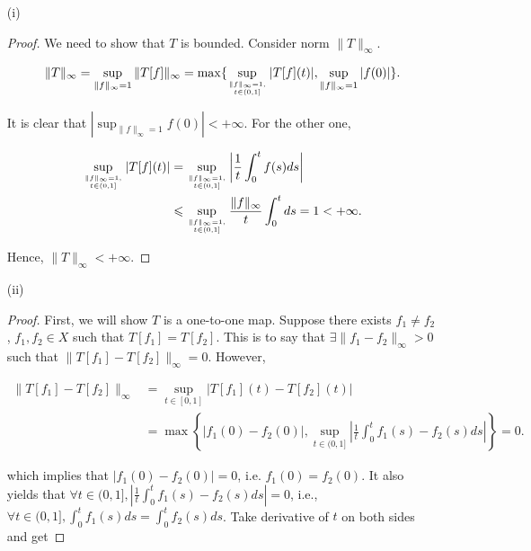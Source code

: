 \documentclass[12pt]{article}
\begin{document}
\begin{enumerate}

\item [(i)]

\begin{proof}

We need to show that $T$ is bounded. Consider norm $\|T\|_\infty$.

$$
\begin{aligned}
\|T\|_\infty = \sup_{\|f\|_\infty = 1} \|T[f]\|_\infty = \max \{  \sup_{\|f\|_\infty = 1,\atop t\in(0, 1]}|T[f](t)|, \sup_{\|f\|_\infty = 1} |f(0)| \}.
\end{aligned}
$$

It is clear that $|\sup_{\|f\|_\infty = 1}f(0)| <+\infty$. For the other one, 

$$
\begin{aligned}
\sup_{\|f\|_\infty = 1,\atop t\in(0, 1]}|T[f](t)| & = \sup_{\|f\|_\infty = 1,\atop t\in(0, 1]} \left|\frac{1}{t}\int_0^t f(s) ds\right|\\
& \leqslant \sup_{\|f\|_\infty = 1,\atop t\in(0, 1]} \frac{\|f\|_\infty}{t}\int_0^t ds = 1 < +\infty.
\end{aligned}
$$

Hence, $\|T\|_\infty < +\infty$. 

\end{proof}

\item [(ii)]

\begin{proof}

First, we will show $T$ is a one-to-one map. Suppose there exists $f_1\neq f_2$, $f_1, f_2 \in X$ such that $T[f_1] = T[f_2]$. This is to say that $\exists \|f_1 - f_2\|_\infty > 0$ such that $\|T[f_1] - T[f_2]\|_\infty = 0$. However, 

$$
\begin{aligned}
\|T[f_1] - T[f_2]\|_\infty & =   \sup_{ t\in[0, 1]}\left|T[f_1](t) - T[f_2](t)\right| \\
& = \max \left\{  \left|f_1(0) - f_2(0)\right|, \sup_{t\in(0, 1]}\left| \frac{1}{t} \int_0^t f_1(s) - f_2(s) ds \right| \right\} = 0. 
\end{aligned}
$$

which implies that $\left|f_1(0)-f_2(0)\right| = 0 $, i.e. $f_1(0) = f_2(0)$. It also yields that $\forall t \in (0, 1], \left| \frac{1}{t} \int_0^t f_1(s) - f_2(s) ds \right| = 0$, i.e., $ \forall t \in (0, 1], \int_0^t f_1(s) ds = \int_0^t f_2(s) ds$. Take derivative of $t$ on both sides and get 


\end{proof}
\end{enumerate}
\end{document}
